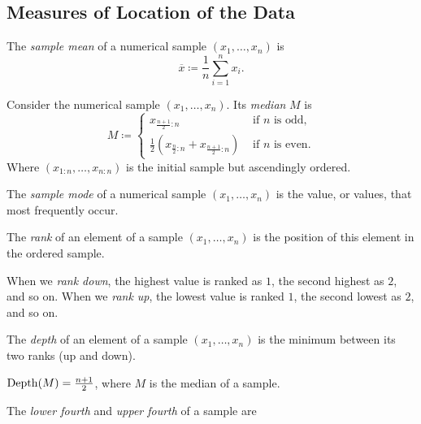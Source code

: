 \subsection{Measures of Location of the Data}
\begin{definition}
   The \emph{sample mean} of a numerical sample $(x_1, \ldots, x_n)$ is
   \begin{equation*}
        \overline{x} \coloneqq \frac{1}{n} \sum_{i=1}^n  x_i. 
   \end{equation*}
\end{definition}

\begin{definition}
   Consider the numerical sample $(x_1, \ldots, x_n)$. Its \emph{median} $M$ is
   \begin{equation*}
     M \coloneqq 
     \begin{cases}
       x_{\frac{n+1}{2}:n} & \text{ if $n$ is odd,} \\
       \frac{1}{2}(x_{\frac{n}{2}:n} + x_{\frac{n+1}{2}:n})  & \text{ if $n$ is even.}
     \end{cases}   
   \end{equation*}
   Where $(x_{1:n}, \ldots, x_{n:n})$ is the initial sample but ascendingly ordered. 
\end{definition}

\begin{definition}
   The \emph{sample mode} of a numerical sample $(x_1, \ldots,  x_n)$ is the value, or values, that most frequently occur.
\end{definition}

\begin{definition}
  The \emph{rank} of an element of a sample $(x_1 , \ldots, x_n)$ is the position of this element in the ordered sample.
  \par
  When we \emph{rank down}, the highest value is ranked as $1$, the second highest as $2$, and so on. When we \emph{rank up}, the lowest value is ranked $1$, the second lowest as $2$, and so on.
  \par
  The \emph{depth} of an element of a sample $(x_1, \ldots, x_n)$ is the minimum between its two ranks (up and down).
\end{definition}

\begin{remark}
    $\operatorname{Depth}(M) = \frac{n+1}{2}$, where $M$ is the median of a sample.
\end{remark}

\begin{definition}
   The \emph{lower fourth} and \emph{upper fourth} of a sample are
\end{definition}